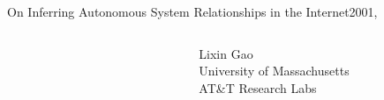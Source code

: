 \documentclass[ngerman,compress,hyperref={bookmarks}]{beamer}
\begin{document}
\begin{frame}{On Inferring Autonomous System Relationships in the Internet}{2001, \cite{Gao:2001:IAS:504611.504616}}
\begin{columns}[c]
\begin{column}{0.1\textwidth}
\begin{figure}
        \label{gao}
      \end{figure}
    \end{column}
    \begin{column}{0.3\textwidth}
      {\scriptsize Lixin Gao\\
      \vspace{0.1cm}
      University of Massachusetts\\
      AT\&T Research Labs\\}
    \end{column}
  \end{columns}
\end{frame}

\end{document}
